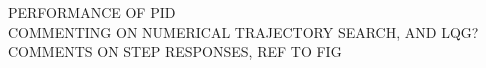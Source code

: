 PERFORMANCE OF PID \\
COMMENTING ON NUMERICAL TRAJECTORY SEARCH, AND LQG? \\
COMMENTS ON STEP RESPONSES, REF TO FIG \\
